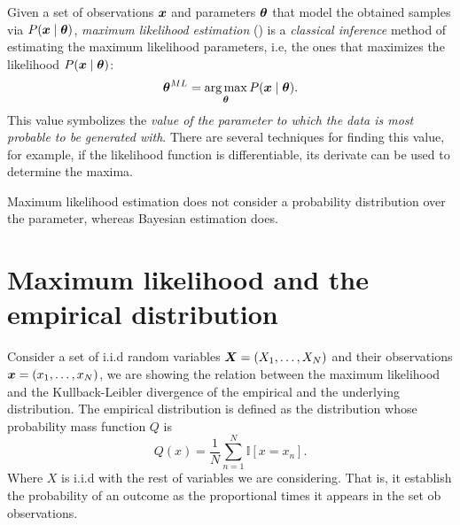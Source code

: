 
Given a set of observations \(\bm{x}\) and parameters \(\bm{\theta}\) that model the obtained samples via \(P(\bm{x} \mid \bm{\theta})\), \emph{maximum likelihood estimation} (\cite{rossi2018mathematical}) is a \emph{classical inference} method of estimating the maximum likelihood parameters, i.e, the ones that maximizes the likelihood \(P(\bm{x} \mid \bm{\theta})\):
  \[
    \bm{\theta}^{ML} = \operatorname*{arg\,max}_{\bm{\theta}} P(\bm{x} \mid \bm{\theta}).
  \]
  This value symbolizes the \emph{value of the parameter to which the data is most probable to be generated with}. There are several techniques for finding this value, for example, if the likelihood function is differentiable, its derivate can be used to determine the maxima.

  \begin{remark}
    Maximum likelihood estimation does not consider a probability distribution over the parameter, whereas Bayesian estimation does.
  \end{remark}

\section{Maximum likelihood and the empirical distribution}

Consider a set of i.i.d random variables \(\bm{X} = (X_{1},\dots, X_{N})\) and their observations \(\bm{x} = (x_{1},\dots,x_{N})\), we are showing the relation between the maximum likelihood and the Kullback-Leibler divergence of the empirical and the underlying distribution. The empirical distribution is defined as the distribution whose probability mass function \(Q\) is
\[
  Q(x) = \frac{1}{N}\sum_{n = 1}^N \mathbb{I}[x = x_n].
\]
Where \(X\) is i.i.d with the rest of variables we are considering. That is, it establish the probability of an outcome as the proportional times it appears in the set ob observations.

